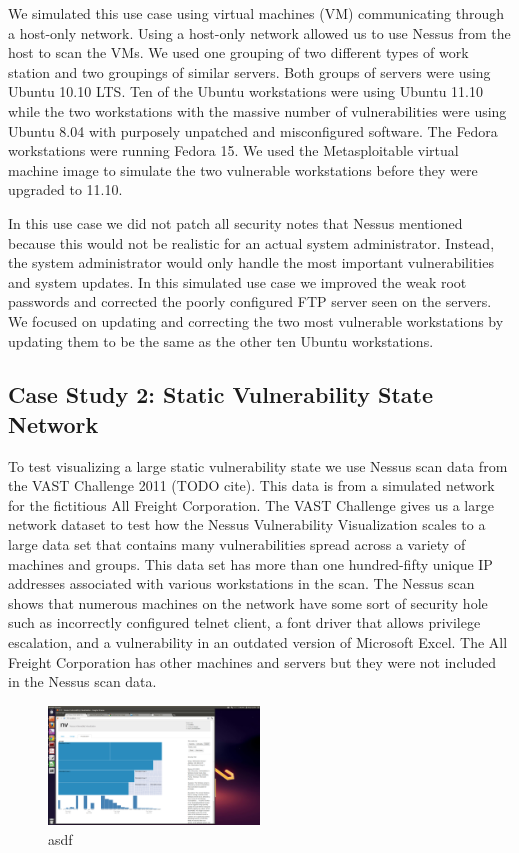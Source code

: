 \documentclass{acm_proc_article-sp}
\begin{document}
We simulated this use case using virtual machines (VM) communicating through a host-only
network. Using a host-only network allowed us to use Nessus from the host
to scan the VMs. We used one grouping of two different types of work station
and two groupings of similar servers. Both groups of servers were using Ubuntu 10.10 LTS.
Ten of the Ubuntu workstations were using Ubuntu 11.10 while the two workstations
with the massive number of vulnerabilities were using Ubuntu 8.04 with
purposely unpatched and misconfigured software.
The Fedora workstations were running Fedora 15.  We used the Metasploitable
virtual machine image to simulate the two vulnerable workstations before they
were upgraded to 11.10.

In this use case we did not patch all security notes that Nessus mentioned
because this would not be realistic for an actual system administrator. Instead,
the system administrator would only handle the most important vulnerabilities and
system updates. In this simulated use case we improved the weak root passwords
and corrected the poorly configured FTP server seen on the servers. We focused on updating
and correcting the two most vulnerable workstations by updating them to be the
same as the other ten Ubuntu workstations.



\subsection{Case Study 2: Static Vulnerability State Network }
To test visualizing a large static vulnerability state we use Nessus scan data from
the VAST Challenge 2011 (TODO cite). This data is from a simulated network for the
fictitious All Freight Corporation. The VAST Challenge gives us a large network
dataset to test how the Nessus Vulnerability Visualization scales to a large
data set that contains many vulnerabilities spread across a variety of machines and
groups. This data set has more than one
hundred-fifty unique IP addresses associated with various workstations in the
scan. The Nessus scan shows that numerous
machines on the network have some sort of security hole such as incorrectly
configured telnet client, a font driver that allows privilege escalation, and a
vulnerability in an outdated version of Microsoft Excel. The All Freight
Corporation has other machines and servers but they were not included in the
Nessus scan data.

\begin{figure}
  \centering
  \includegraphics[width=0.5\textwidth]{../screenshots/final/VastGroup}
  \caption{asdf}
\end{figure}
\end{document}
